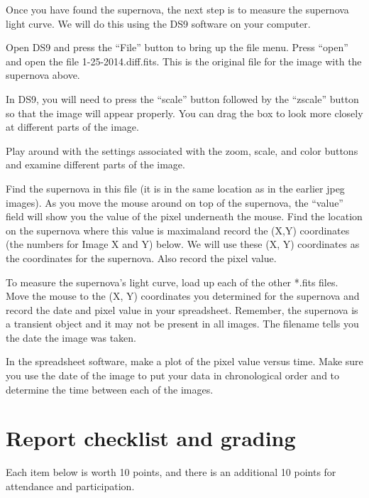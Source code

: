 Once you have found the supernova, the next step is to measure the
supernova light curve. We will do this using the DS9 software on your
computer.
\begin{steps}
	\item Open DS9 and press the “File” button to bring up the file
	menu. Press “open” and open the file 1-25-2014.diff.fits. This is the
	original file for the image with the supernova above.
\end{steps}

In DS9, you will need to press the “scale” button followed by the “zscale”
button so that the image will appear properly. You can drag the box to
look more closely at different parts of the image.
\begin{steps}
	\item Play around with the
	settings associated with the zoom, scale, and color buttons and examine
	different parts of the image.
	
	\item Find the supernova in this file (it is in the same location as in the earlier
	jpeg images). As you move the mouse around on top of the supernova,
	the “value” field will show you the value of the pixel underneath the
	mouse. Find the location on the supernova where this value is maximaland record the (X,Y) coordinates (the numbers for Image X and Y)
	below. We will use these (X, Y) coordinates as the coordinates for the
	supernova. Also record the pixel value.
	
	\item To measure the supernova’s light curve, load up each of the other *.fits
	files. Move the mouse to the (X, Y) coordinates you determined for the
	supernova and record the date and pixel value in your spreadsheet. Remember, the
	supernova is a transient object and it may not be present in all images.
	The filename tells you the date the image was taken.
	
	\item In the spreadsheet software, make a plot of the pixel value versus time. Make sure you use
	the date of the image to put your data in chronological order and to
	determine the time between each of the images.
\end{steps}

\section{Report checklist and grading}

Each item below is worth 10 points, and there is an additional 10 points for attendance and participation.


